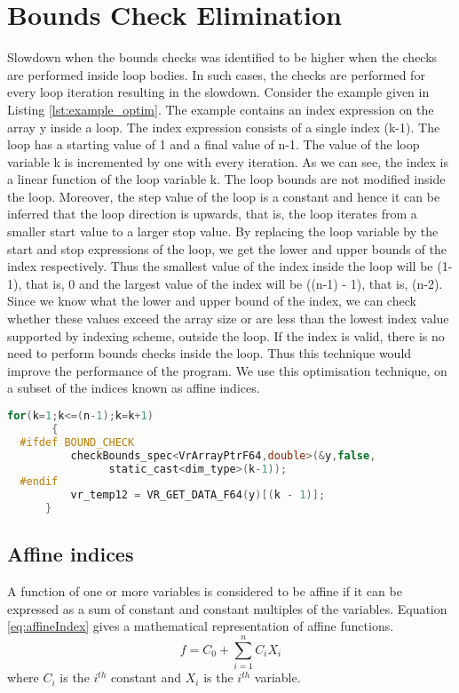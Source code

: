 \section{Bounds Check Elimination}
Slowdown when the bounds checks was identified to be higher when the checks are performed inside loop bodies. In such cases, the checks are performed for every loop iteration resulting in the slowdown. Consider the example given in Listing \ref{lst:example_optim}. The example contains an index expression on the array y inside a loop. The index expression consists of a single index (k-1). The loop has a starting value of 1 and a final value of n-1. The value of the loop variable k is incremented by one with every iteration. As we can see, the index is a linear function of the loop variable k. The loop bounds are not modified inside the loop. Moreover, the step value of the loop is a constant and hence it can be inferred that the loop direction is upwards, that is, the loop iterates from a smaller start value to a larger stop value. By replacing the loop variable by the start and stop expressions of the loop, we get the lower and upper bounds of the index respectively. Thus the smallest value of the index inside the loop will be (1-1), that is, 0 and the largest value of the index will be ((n-1) - 1), that is, (n-2). Since we know what the lower and upper bound of the index, we can check whether these values exceed the array size or are less than the lowest index value supported by indexing scheme, outside the loop. If the index is valid, there is no need to perform bounds checks inside the loop. Thus this technique would improve the performance of the program. We use this optimisation technique, on a subset of the indices known as affine indices. 
\begin{lstlisting}[float,language=c,caption={Example C++ for loop with array index expressions},label={lst:example_optim}]
   for(k=1;k<=(n-1);k=k+1)
       {
  #ifdef BOUND_CHECK
          checkBounds_spec<VrArrayPtrF64,double>(&y,false,
				static_cast<dim_type>(k-1));
  #endif
          vr_temp12 = VR_GET_DATA_F64(y)[(k - 1)];
      }
\end{lstlisting}
\subsection{Affine indices}
A function of one or more variables is considered to be affine if it can be expressed as a sum of constant and constant multiples of the variables. Equation \ref{eq:affineIndex} gives a mathematical representation of affine functions. 
\begin{equation}
\label{eq:affineIndex}
f = C_0 + \sum\limits_{i=1}^n C_iX_i 
\end{equation}
where $C_i$ is the $i^{th}$ constant and $X_i$ is the $i^{th}$ variable. 

